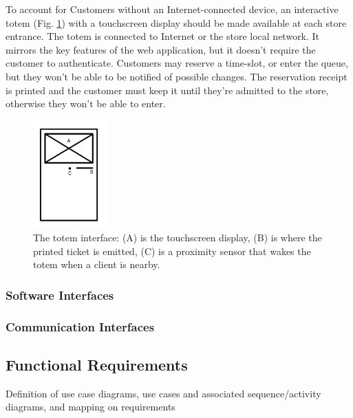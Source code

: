 To account for Customers without an Internet-connected device,
an interactive totem (Fig. \ref{fig:totem}) with a touchscreen display should be made available at each store entrance.
The totem is connected to Internet or the store local network.
It mirrors the key features of the web application, but it doesn't require the customer to
authenticate. Customers may reserve a time-slot, or enter the queue, but they won't be able to
be notified of possible changes. The reservation receipt is printed and the customer must keep it until they're
admitted to the store, otherwise they won't be able to enter.
\begin{figure}[h]
    \centering
    \includegraphics[width=0.25\textwidth]{images/totem.pdf}
    \caption{The totem interface: (A) is the touchscreen display,
    (B) is where the printed ticket is emitted, (C) is a proximity sensor that wakes the
    totem when a client is nearby.}
    \label{fig:totem}
\end{figure}

\subsubsection{Software Interfaces}
\subsubsection{Communication Interfaces}

\subsection{Functional Requirements}
Definition of use case diagrams, use cases and associated
sequence/activity diagrams, and mapping on requirements

